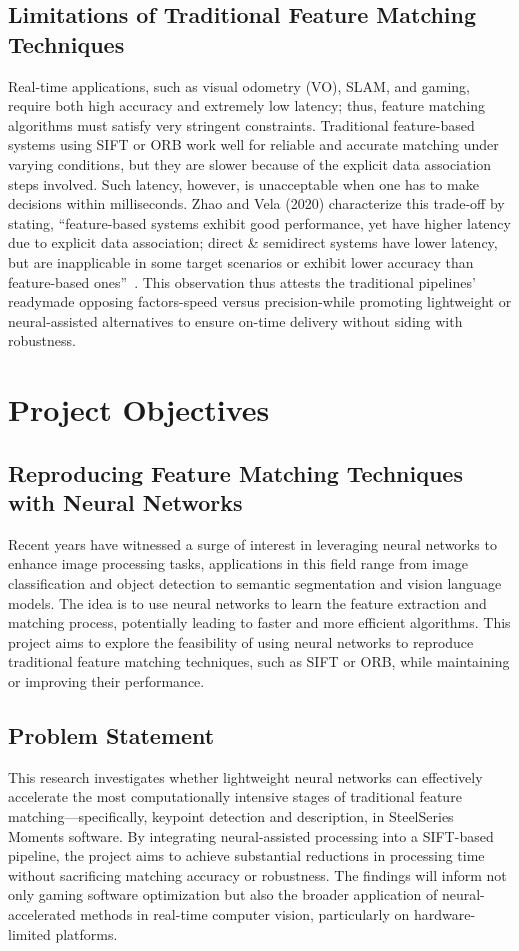\subsection{Limitations of Traditional Feature Matching Techniques}
Real-time applications, such as visual odometry (VO), SLAM, and gaming, require both high accuracy and extremely low latency; thus, feature matching algorithms must satisfy very stringent constraints. Traditional feature-based systems using SIFT or ORB work well for reliable and accurate matching under varying conditions, but they are slower because of the explicit data association steps involved. Such latency, however, is unacceptable when one has to make decisions within milliseconds. Zhao and Vela (2020) characterize this trade-off by stating, ``feature-based systems exhibit good performance, yet have higher latency due to explicit data association; direct \& semidirect systems have lower latency, but are inapplicable in some target scenarios or exhibit lower accuracy than feature-based ones''~\cite{zhao2020good}. This observation thus attests the traditional pipelines' readymade opposing factors-speed versus precision-while promoting lightweight or neural-assisted alternatives to ensure on-time delivery without siding with robustness.

\section{Project Objectives}
\subsection{Reproducing Feature Matching Techniques with Neural Networks}
Recent years have witnessed a surge of interest in leveraging neural networks to enhance image processing tasks, applications in this field range from image classification and object detection to semantic segmentation and vision language models. The idea is to use neural networks to learn the feature extraction and matching process, potentially leading to faster and more efficient algorithms. This project aims to explore the feasibility of using neural networks to reproduce traditional feature matching techniques, such as SIFT or ORB, while maintaining or improving their performance.
\subsection{Problem Statement}
This research investigates whether lightweight neural networks can effectively accelerate the most computationally intensive stages of traditional feature matching—specifically, keypoint detection and description, in SteelSeries Moments software. By integrating neural-assisted processing into a SIFT-based pipeline, the project aims to achieve substantial reductions in processing time without sacrificing matching accuracy or robustness. The findings will inform not only gaming software optimization but also the broader application of neural-accelerated methods in real-time computer vision, particularly on hardware-limited platforms.
